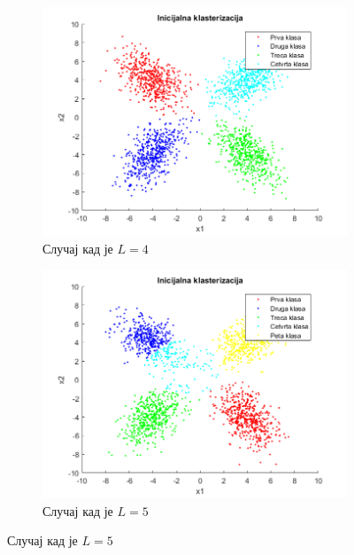 \begin{figure}[htb!]
\begin{subfigure}{.55\textwidth}
\includegraphics[width=1\linewidth]{pictures/4/CMean4Final}
\caption{Случај кад је $L=4$}\label{pic:cMean4Final}
\end{subfigure}
\begin{subfigure}{.55\textwidth}
\centering
\includegraphics[width=1\linewidth]{pictures/4/CMean5Final}
\caption{Случај кад је $L=5$}\label{pic:cMean5Final}
\end{subfigure}
\end{figure}
